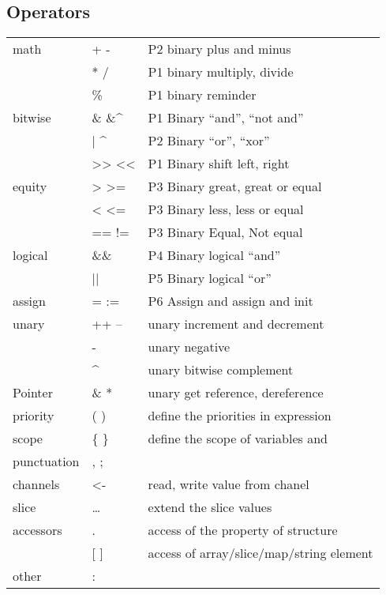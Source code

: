 \documentclass[12pt]{article}
\begin{document}
\subsection{Operators}
\begin{paracol}{2}
\begin{leftcolumn}
\begin{tabular}{lll}
math        & + -       & P2 binary plus and minus \\
            & * /       & P1 binary multiply, divide \\
            & \%        & P1 binary reminder \\
bitwise     & \& \&\^{} & P1 Binary ``and'', ``not and'' \\
            & | \^{}    & P2 Binary ``or'', ``xor'' \\
            & >> <<     & P1 Binary shift left, right \\
equity       & > >=      & P3 Binary great, great or equal \\
            & < <=      & P3 Binary less, less or equal \\
            & == !=     & P3 Binary Equal, Not equal \\
logical     & \&\&      & P4 Binary logical ``and'' \\
            & ||        & P5 Binary logical ``or'' \\
assign      & = :=      & P6 Assign and assign and init \\
unary       & ++ --     & unary increment and decrement \\
            & -         & unary negative \\
            & \^{}      & unary bitwise complement \\
Pointer     & \& *      & unary get reference, dereference\\
priority    & ( )       & define the priorities in expression \\
scope       & \{ \}     & define the scope of variables and \\
punctuation & , ;       & \\
channels    & <-        & read, write value from chanel\\
slice       & \ldots    & extend the slice values \\
accessors   & .         & access of the property of structure \\
            & [ ]       & access of array/slice/map/string element \\
other       & : ~       &  \\
\end{tabular}


\end{leftcolumn}
\end{paracol}
\end{document}
